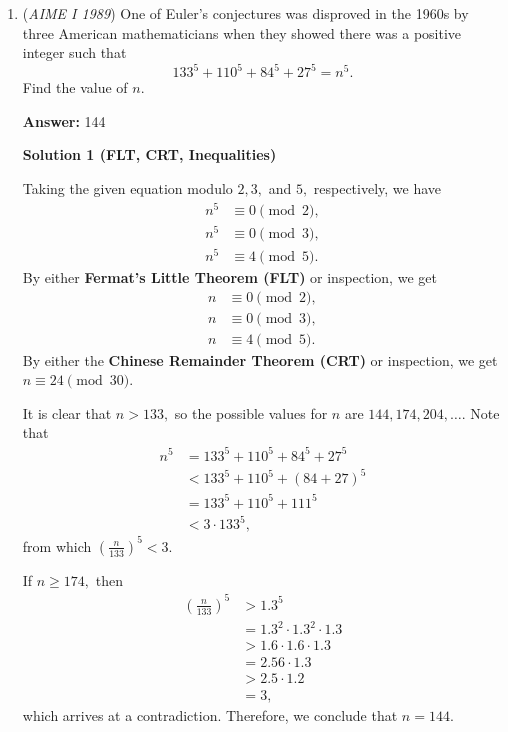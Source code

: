 \begin{enumerate}
 
Subtracting $(1)$ from $(2)$ yields
 \[3x_{1}+5x_{2}+7x_{3}+9x_{4}+11x_{5}+13x_{6}+15x_{7} = 11 \ \ (4)\]and subtracting $(2)$ from $(3)$ yields
 \[5x_{1}+7x_{2}+9x_{3}+11x_{4}+13x_{5}+15x_{6}+17x_{7} = 111 \ \ \ (5)\]subtracting $(4)$ from $(5)$ yields
 \[2x_{1}+2x_{2}+2x_{3}+2x_{4}+2x_{5}+2x_{6}+2x_{7} = 100 \ \ \ (6)\]Adding this back to $(5)$ yields
 \[7x_{1}+9x_{2}+11x_{3}+13x_{4}+15x_{5}+17x_{6}+19x_{7}=211 \ \ \ (7)\]Now, simply adding $(7)$ to $(3)$ yields
 \[16x_1+25x_2+36x_3+49x_4+64x_5+81x_6+100x_7 = \boxed{334}\]~shockfront99(omg this is my first AIME solve)

 


	\item (\textit{AIME I 1989}) One of Euler's conjectures was disproved in the 1960s by three American mathematicians when they showed there was a positive integer such that 
 \[133^5+110^5+84^5+27^5=n^{5}.\] Find the value of $n$.


 
 \textbf{Answer: }144



\textbf{Solution 1 (FLT, CRT, Inequalities)}

Taking the given equation modulo $2,3,$ and $5,$ respectively, we have
 \begin{align*} n^5&\equiv0\pmod{2}, \\ n^5&\equiv0\pmod{3}, \\ n^5&\equiv4\pmod{5}. \end{align*}
By either \textbf{Fermat's Little Theorem (FLT)} or inspection, we get
 \begin{align*} n&\equiv0\pmod{2}, \\ n&\equiv0\pmod{3}, \\ n&\equiv4\pmod{5}. \end{align*}
By either the \textbf{Chinese Remainder Theorem (CRT)} or inspection, we get $n\equiv24\pmod{30}.$

 It is clear that $n>133,$ so the possible values for $n$ are $144,174,204,\ldots.$ Note that
 \begin{align*} n^5&=133^5+110^5+84^5+27^5 \\ &<133^5+110^5+(84+27)^5 \\ &=133^5+110^5+111^5 \\ &<3\cdot133^5, \end{align*}
from which $\left(\frac{n}{133}\right)^5<3.$

 If $n\geq174,$ then
 \begin{align*} \left(\frac{n}{133}\right)^5&>1.3^5 \\ &=1.3^2\cdot1.3^2\cdot1.3 \\ &>1.6\cdot1.6\cdot1.3 \\ &=2.56\cdot1.3 \\ &>2.5\cdot1.2 \\ &=3, \end{align*}
which arrives at a contradiction. Therefore, we conclude that $n=\boxed{144}.$





\end{enumerate}
